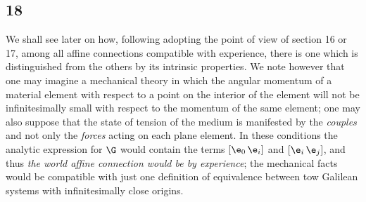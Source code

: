 \subsection*{18}
We shall see later on how, following adopting the point of view of section 16 or 17, among all affine connections compatible with experience, there is one which is distinguished from the others by its intrinsic properties. We note however that one may imagine a mechanical theory in which the angular momentum of a material element with respect to a point on the interior of the element will not be infinitesimally small with respect to the momentum of the same element; one may also suppose that the state of tension of the medium is manifested by the \textit{couples} and not only the \textit{forces} acting on each plane element. In these conditions the analytic expression for $\G$ would contain the terms $[\e_0 \, \e_i]$ and $[\e_i \, \e_j]$, and thus \textit{the world affine connection would be  by experience}; the mechanical facts would be compatible with just one definition of equivalence between tow Galilean systems with infinitesimally close origins.
